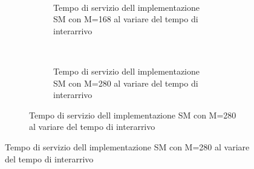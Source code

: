 \documentclass[a4paper]{article}
\begin{document}
\begin{figure}[!h]
\begin{subfigure}[b]{.5\columnwidth}
    ~
    \begin{subfigure}[b]{\textwidth}
      \centering
      \addtocounter{subfigure}{-1}
      \renewcommand\thesubfigure{\alph{subfigure}2}
      \resizebox{\columnwidth}{!}{}
      \caption{Tempo di servizio dell implementazione SM con M=168 al variare del tempo di interarrivo}
      \label{fig:scalability_SM_size168}
    \end{subfigure}
    ~
    \begin{subfigure}[b]{\textwidth}
      \centering
      \addtocounter{subfigure}{-1}
      \renewcommand\thesubfigure{\alph{subfigure}3}
      \resizebox{\columnwidth}{!}{}
      \caption{Tempo di servizio dell implementazione SM con M=280 al variare del tempo di interarrivo}
      \label{fig:scalability_SM_size280}
    \end{subfigure}
    \label{fig:allscalability_SM}
  \end{subfigure}
\end{figure}
\end{document}
